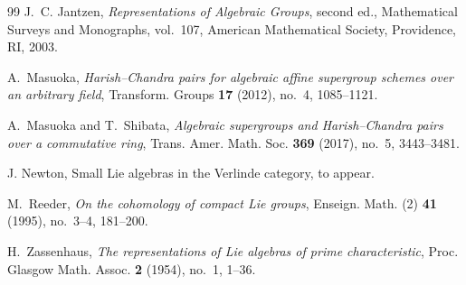 \documentclass[12pt]{amsart}
\theoremstyle{remark}
\begin{document}
\begin{thebibliography}{99}
J.~C. Jantzen,
\emph{Representations of Algebraic Groups}, second ed.,
Mathematical Surveys and Monographs, vol.~107,
American Mathematical Society, Providence, RI, 2003.

A.~Masuoka,
\emph{Harish--Chandra pairs for algebraic affine supergroup schemes
over an arbitrary field},
Transform. Groups \textbf{17} (2012), no.~4, 1085--1121.

A.~Masuoka and T.~Shibata,
\emph{Algebraic supergroups and Harish--Chandra pairs over a
commutative ring},
Trans. Amer. Math. Soc. \textbf{369} (2017), no.~5, 3443--3481.

 J. Newton, Small Lie algebras in the Verlinde category, to appear.

M.~Reeder,
\emph{On the cohomology of compact Lie groups},
Enseign. Math. (2) \textbf{41} (1995), no.~3--4, 181--200.

H.~Zassenhaus,
\emph{The representations of Lie algebras of prime characteristic},
Proc. Glasgow Math. Assoc. \textbf{2} (1954), no.~1, 1--36.

\end{thebibliography}
\end{document}
